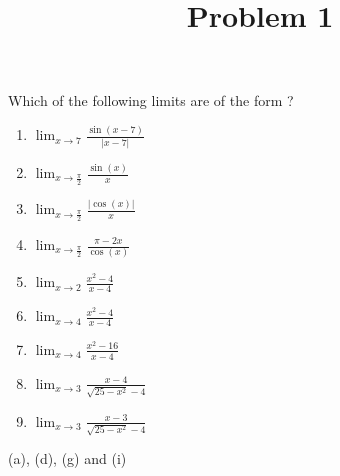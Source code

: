 \documentclass{ximera}
\title[Problem 1]{Problem 1}
\begin{document}
\begin{abstract} \end{abstract}
\maketitle


\begin{problem}
	Which of the following limits are of the form \ZeroOverZero?	
	\begin{enumerate}
		\item $\displaystyle \lim_{x \to 7} \frac{\sin{(x-7)}}{|x-7|}  $
		\item $\displaystyle \lim_{x \to \frac{\pi}{2}} \frac{\sin{(x)}}{x}  $
		\item $\displaystyle \lim_{x \to \frac{\pi}{2}} \frac{|\cos{(x)}|}{x}  $
		\item $\displaystyle \lim_{x \to \frac{\pi}{2}} \frac{\pi-2x}{\cos{(x)}}$
		\item	$\displaystyle\lim_{x \to 2} \frac{x^2 - 4}{x-4} $\\
		\item	$\displaystyle\lim_{x \to 4} \frac{x^2 - 4}{x-4} $\\
		\item	$\displaystyle\lim_{x \to 4} \frac{x^2 - 16}{x-4} $\\
		\item	$\displaystyle\lim_{x \to 3} \frac{x-4}{\sqrt{25-x^2 }-4} $\\
		\item	$\displaystyle\lim_{x \to 3} \frac{x-3}{\sqrt{25-x^2 }-4} $\\
	\end{enumerate}
\begin{explanation}
	(a), (d), (g) and (i)
	\end{explanation}
\end{problem}
\end{document}
